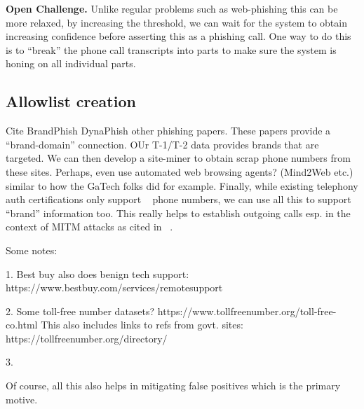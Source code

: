 \textbf{Open Challenge.} Unlike regular problems such as web-phishing this can be more relaxed, by increasing the threshold, we can wait for the system to obtain increasing confidence before asserting this as a phishing call. One way to do this is to ``break'' the phone call transcripts into parts to make sure the system is honing on all individual parts. 

\subsection*{Allowlist creation}

Cite BrandPhish DynaPhish other phishing papers. These papers provide a ``brand-domain'' connection. OUr T-1/T-2 data provides brands that are targeted. We can then develop a site-miner to obtain scrap phone numbers from these sites. Perhaps, even use automated web browsing agents? (Mind2Web etc.) similar to how the GaTech folks did for example. Finally, while existing telephony auth certifications only support ~\cite{ReavesBAVTS17} phone numbers, we can use all this to support ``brand'' information too. This really helps to establish outgoing calls esp. in the context of MITM attacks as cited in ~\cite{ReavesBAVTS17}.

Some notes:

1. Best buy also does benign tech support: https://www.bestbuy.com/services/remotesupport 

2. Some toll-free number datasets? https://www.tollfreenumber.org/toll-free-co.html This also includes links to refs from govt. sites: https://tollfreenumber.org/directory/

3. 

Of course, all this also helps in mitigating false positives which is the primary motive. 

